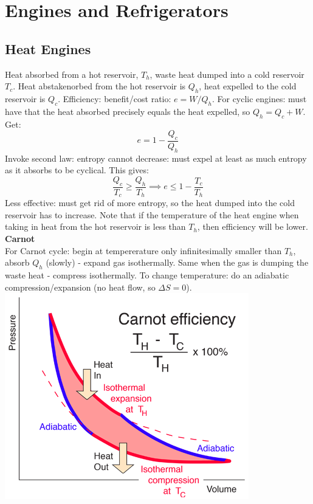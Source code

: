 \documentclass[a4paper,norsk, 10pt]{article}
\begin{document}
\section{Engines and Refrigerators}
\subsection{Heat Engines}
Heat absorbed from a hot reservoir, $T_h$, waste heat dumped into a cold reservoir $T_c$. Heat abstakenorbed from the hot reservoir is $Q_h$, heat expelled to the cold reservoir is $Q_c$. Efficiency: benefit/cost ratio: $e=W/Q_h$. For cyclic engines: must have that the heat absorbed precisely equals the heat expelled, so $Q_h=Q_c+W$. Get:
\begin{equation}
e=1-\frac{Q_c}{Q_h}
\end{equation}
Invoke second law: entropy cannot decrease: must expel at least as much entropy as it absorbs to be cyclical. This gives:
\begin{equation}
\frac{Q_c}{T_c}\geq \frac{Q_h}{T_h} \implies e \leq 1-\frac{T_c}{T_h}
\end{equation}
Less effective: must get rid of more entropy, so the heat dumped into the cold reservoir has to increase. Note that if the temperature of the heat engine when taking in heat from the hot reservoir is less than $T_h$, then efficiency will be lower.\\
\textbf{Carnot}\\
For Carnot cycle: begin at tempererature only infinitesimally smaller than $T_h$, absorb $Q_h$ (slowly) - expand gas isothermally. Same when the gas is dumping the waste heat - compress isothermally. To change temperature: do an adiabatic compression/expansion (no heat flow,  so $\Delta S=0$).
\includegraphics[scale=0.5]{carnot.png}
\end{document}

